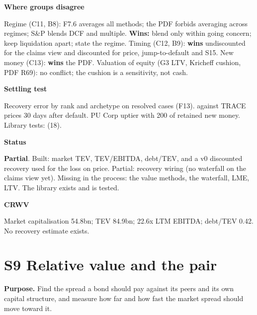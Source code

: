 \documentclass[11pt]{article}
\newcommand{\stpartial}{\textcolor{warn}{\textbf{Partial}}}
\newcommand{\fld}[1]{\par\medskip\noindent\textbf{\textcolor{steel}{#1}}\par\nopagebreak}
\begin{document}
\fld{Where groups disagree} Regime (C11, B8): F7.6 averages all methods; the PDF forbids averaging across regimes; S\&P blends DCF and multiple. \textbf{Wins:} blend only within going concern; keep liquidation apart; state the regime. Timing (C12, B9): \textbf{wins} undiscounted for the claims view and discounted for price, jump-to-default and S15. New money (C13): \textbf{wins} the PDF. Valuation of equity (G3 LTV, Kricheff cushion, PDF R69): no conflict; the cushion is a sensitivity, not cash.

\fld{Settling test} Recovery error by rank and archetype on resolved cases (F13).  against TRACE prices 30 days after default. PU Corp uptier with 200 of retained new money. Library tests:  (18).

\fld{Status} \stpartial. Built: market TEV, TEV/EBITDA, debt/TEV, and a v0 discounted recovery used for the loss on price. Partial: recovery wiring (no waterfall on the claims view yet). Missing in the process: the value methods, the waterfall, LME, LTV. The library exists and is tested.

\fld{CRWV} Market capitalisation 54.8bn; TEV 84.9bn; 22.6x LTM EBITDA; debt/TEV 0.42. No recovery estimate exists.

\section{S9 Relative value and the pair}\label{s9}

\textbf{Purpose.} Find the spread a bond should pay against its peers and its own capital structure, and measure how far and how fast the market spread should move toward it.
\end{document}
